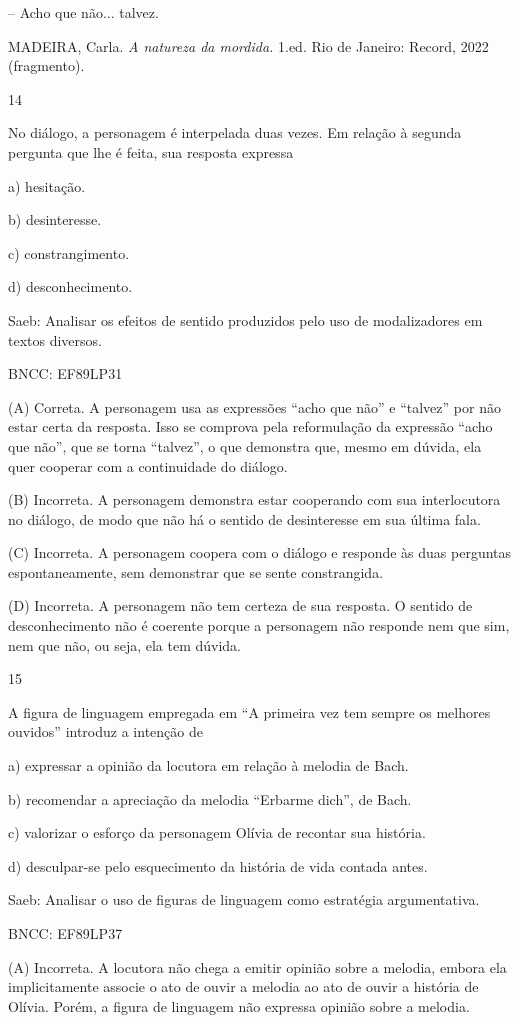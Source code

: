 -- Acho que não... talvez.

MADEIRA, Carla. \emph{A natureza da mordida.} 1.ed. Rio de Janeiro:
Record, 2022 (fragmento).

\num{14}

No diálogo, a personagem é interpelada duas vezes. Em relação à segunda
pergunta que lhe é feita, sua resposta expressa

a) hesitação.

b) desinteresse.

c) constrangimento.

d) desconhecimento.

Saeb: Analisar os efeitos de sentido produzidos pelo uso de
modalizadores em textos diversos.

BNCC: EF89LP31

(A) Correta. A personagem usa as expressões ``acho que não'' e
``talvez'' por não estar certa da resposta. Isso se comprova pela
reformulação da expressão ``acho que não'', que se torna ``talvez'', o
que demonstra que, mesmo em dúvida, ela quer cooperar com a continuidade
do diálogo.

(B) Incorreta. A personagem demonstra estar cooperando com sua
interlocutora no diálogo, de modo que não há o sentido de desinteresse
em sua última fala.

(C) Incorreta. A personagem coopera com o diálogo e responde às duas
perguntas espontaneamente, sem demonstrar que se sente constrangida.

(D) Incorreta. A personagem não tem certeza de sua resposta. O sentido
de desconhecimento não é coerente porque a personagem não responde nem
que sim, nem que não, ou seja, ela tem dúvida.

\num{15}

A figura de linguagem empregada em ``A primeira vez tem sempre os
melhores ouvidos'' introduz a intenção de

a) expressar a opinião da locutora em relação à melodia de Bach.

b) recomendar a apreciação da melodia ``Erbarme dich'', de Bach.

c) valorizar o esforço da personagem Olívia de recontar sua história.

d) desculpar-se pelo esquecimento da história de vida contada antes.

Saeb: Analisar o uso de figuras de linguagem como estratégia
argumentativa.

BNCC: EF89LP37

(A) Incorreta. A locutora não chega a emitir opinião sobre a melodia,
embora ela implicitamente associe o ato de ouvir a melodia ao ato de
ouvir a história de Olívia. Porém, a figura de linguagem não expressa
opinião sobre a melodia.

